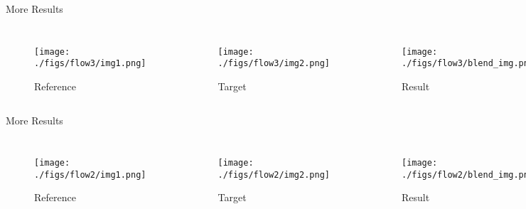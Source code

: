 \documentclass{beamer}
\begin{document}
\begin{frame}{More Results}
\begin{columns}[b]
\begin{figure}\texttt{[image: ./figs/flow3/img1.png]}\caption{Reference}\end{figure}
\begin{figure}\texttt{[image: ./figs/flow3/img2.png]}\caption{Target}\end{figure}
\begin{figure}\texttt{[image: ./figs/flow3/blend\_img.png]}\caption{Result}\end{figure}
\end{columns}
\vspace{0pt}
\end{frame} 

\begin{frame}{More Results}
\begin{columns}[b]
\begin{figure}\texttt{[image: ./figs/flow2/img1.png]}\caption{Reference}\end{figure}
\begin{figure}\texttt{[image: ./figs/flow2/img2.png]}\caption{Target}\end{figure}
\begin{figure}\texttt{[image: ./figs/flow2/blend\_img.png]}\caption{Result}\end{figure}
\end{columns}
\vspace{0pt} 
\end{frame}

\end{document}
